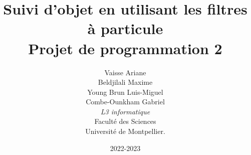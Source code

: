 \documentclass[a4paper, draft]{report}
\title{  Suivi d'objet en utilisant les filtres à particule\\         %
  Projet de programmation 2}
\author{ Vaisse Ariane\\
	 Beldjilali Maxime\\
	 Young Brun Luis-Miguel\\
	 Combe-Ounkham Gabriel\\
  \emph{L3 informatique}\\
  Faculté des Sciences\\
Université de Montpellier.}
\date{2022-2023}
\begin{document}
\maketitle



\tableofcontents \clearpage

\listoffigures \clearpage
















\cite{Helle2009}
\cite{wifialliance}
\cite{CiscoVNI2017}
\cite{Knuth}
\cite{lamport94}

\printbibliography


\end{document}
